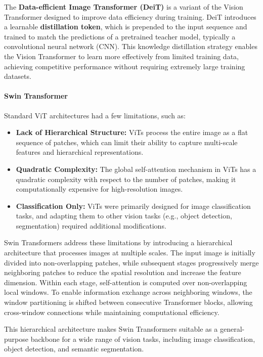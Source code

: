 The \textbf{Data-efficient Image Transformer (DeiT)} is a variant of the Vision Transformer designed to improve data efficiency during training.
DeiT introduces a learnable \textbf{distillation token}, which is prepended to the input sequence and trained to match the predictions of a pretrained teacher model, typically a convolutional neural network (CNN).
This knowledge distillation strategy enables the Vision Transformer to learn more effectively from limited training data, achieving competitive performance without requiring extremely large training datasets.

\paragraph{Swin Transformer}
Standard ViT architectures had a few limitations, such as:
\begin{itemize}
    \item \textbf{Lack of Hierarchical Structure:} ViTs process the entire image as a flat sequence of patches, 
    which can limit their ability to capture multi-scale features and hierarchical representations.
    \item \textbf{Quadratic Complexity:} The global self-attention mechanism in ViTs has a quadratic complexity with respect to the number of patches, 
    making it computationally expensive for high-resolution images.
    \item \textbf{Classification Only:} ViTs were primarily designed for image classification tasks, 
    and adapting them to other vision tasks (e.g., object detection, segmentation) required additional modifications.
\end{itemize}

Swin Transformers address these limitations by introducing a hierarchical architecture that processes images at multiple scales.
The input image is initially divided into non-overlapping patches, while subsequent stages progressively merge neighboring patches to reduce the spatial resolution and increase the feature dimension.
Within each stage, self-attention is computed over non-overlapping local windows.
To enable information exchange across neighboring windows, the window partitioning is shifted between consecutive Transformer blocks, 
allowing cross-window connections while maintaining computational efficiency.

This hierarchical architecture makes Swin Transformers suitable as a general-purpose backbone for a wide range of vision tasks, including image classification, object detection, and semantic segmentation.